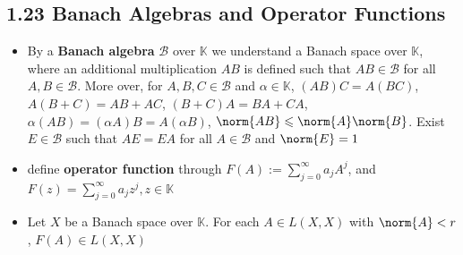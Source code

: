 \subsection{1.23 Banach Algebras and Operator Functions}
\begin{itemize}
\item By a \textbf{Banach algebra} $\mathcal B$ over $\mathbb K$ we understand a Banach space over $\mathbb K$, where an additional multiplication $AB$ is defined such that $AB \in \mathcal B$ for all $A, B \in \mathcal B$. More over, for $A, B, C \in \mathcal B$ and $\alpha \in \mathbb K$, $(AB)C = A(BC)$, $A(B+C) = AB + AC$, $(B+C)A = BA + CA$, $\alpha(AB) = (\alpha A)B = A(\alpha B)$, $\norm{AB} \leqslant \norm{A}\norm{B}$. Exist $E \in \mathcal B$ such that $AE = EA$ for all $A \in \mathcal B$ and $\norm{E} = 1$

\item define \textbf{operator function} through $F(A) := \sum_{j=0}^\infty a_j A^j$, and $F(z) = \sum_{j=0}^\infty a_j z^j, z\in \mathbb K$

\item Let $X$ be a Banach space over $\mathbb K$. For each $A \in L(X, X)$ with $\norm{A} < r$, $F(A) \in L(X, X)$
\end{itemize}

